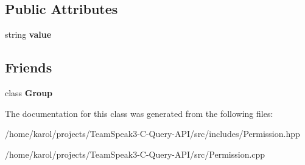 \subsection*{Public Attributes}
\begin{DoxyCompactItemize}
\item 
string {\bfseries value}\hypertarget{class_ts3_api_1_1_permission_ae096a38d2f9bb6850ddca16d5d71f71c}{}\label{class_ts3_api_1_1_permission_ae096a38d2f9bb6850ddca16d5d71f71c}

\end{DoxyCompactItemize}
\subsection*{Friends}
\begin{DoxyCompactItemize}
\item 
class {\bfseries Group}\hypertarget{class_ts3_api_1_1_permission_a2697825715974a353728f0d4d5658112}{}\label{class_ts3_api_1_1_permission_a2697825715974a353728f0d4d5658112}

\end{DoxyCompactItemize}


The documentation for this class was generated from the following files\+:\begin{DoxyCompactItemize}
\item 
/home/karol/projects/\+Team\+Speak3-\/\+C-\/\+Query-\/\+A\+P\+I/src/includes/Permission.\+hpp\item 
/home/karol/projects/\+Team\+Speak3-\/\+C-\/\+Query-\/\+A\+P\+I/src/Permission.\+cpp\end{DoxyCompactItemize}
